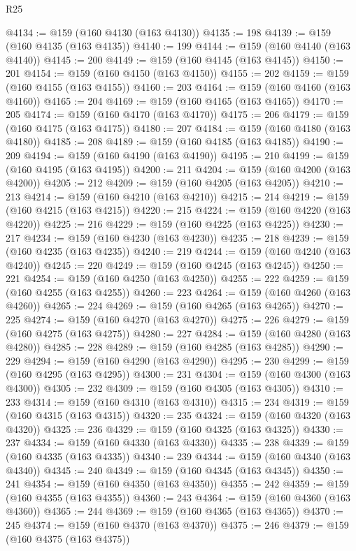 \begin{lexlean}{R25}
\begin{coremodule}
{{{{{{{{{{{{{{{{{{{{{{{{{{{{{{{{{{{{{{{{{{{{{{{{{{{{{{{{{{{{{{{{{{{{{{{{{{{{{{{{{{{{{{{{{{{{{{{{{{{{{{{{{{{{{{{{{{{{{{{{{{{{{{{{{{{{{{{{{{{{{{{{{{{{{{{{{{{{{{{{{{{{{{{{{{{{{{{{{{{{{{{{{{{{{{{{{{{{{{{@4134 := @159 (@160 @4130 (@163 @4130))
@4135 := 198
@4139 := @159 (@160 @4135 (@163 @4135))
@4140 := 199
@4144 := @159 (@160 @4140 (@163 @4140))
@4145 := 200
@4149 := @159 (@160 @4145 (@163 @4145))
@4150 := 201
@4154 := @159 (@160 @4150 (@163 @4150))
@4155 := 202
@4159 := @159 (@160 @4155 (@163 @4155))
@4160 := 203
@4164 := @159 (@160 @4160 (@163 @4160))
@4165 := 204
@4169 := @159 (@160 @4165 (@163 @4165))
@4170 := 205
@4174 := @159 (@160 @4170 (@163 @4170))
@4175 := 206
@4179 := @159 (@160 @4175 (@163 @4175))
@4180 := 207
@4184 := @159 (@160 @4180 (@163 @4180))
@4185 := 208
@4189 := @159 (@160 @4185 (@163 @4185))
@4190 := 209
@4194 := @159 (@160 @4190 (@163 @4190))
@4195 := 210
@4199 := @159 (@160 @4195 (@163 @4195))
@4200 := 211
@4204 := @159 (@160 @4200 (@163 @4200))
@4205 := 212
@4209 := @159 (@160 @4205 (@163 @4205))
@4210 := 213
@4214 := @159 (@160 @4210 (@163 @4210))
@4215 := 214
@4219 := @159 (@160 @4215 (@163 @4215))
@4220 := 215
@4224 := @159 (@160 @4220 (@163 @4220))
@4225 := 216
@4229 := @159 (@160 @4225 (@163 @4225))
@4230 := 217
@4234 := @159 (@160 @4230 (@163 @4230))
@4235 := 218
@4239 := @159 (@160 @4235 (@163 @4235))
@4240 := 219
@4244 := @159 (@160 @4240 (@163 @4240))
@4245 := 220
@4249 := @159 (@160 @4245 (@163 @4245))
@4250 := 221
@4254 := @159 (@160 @4250 (@163 @4250))
@4255 := 222
@4259 := @159 (@160 @4255 (@163 @4255))
@4260 := 223
@4264 := @159 (@160 @4260 (@163 @4260))
@4265 := 224
@4269 := @159 (@160 @4265 (@163 @4265))
@4270 := 225
@4274 := @159 (@160 @4270 (@163 @4270))
@4275 := 226
@4279 := @159 (@160 @4275 (@163 @4275))
@4280 := 227
@4284 := @159 (@160 @4280 (@163 @4280))
@4285 := 228
@4289 := @159 (@160 @4285 (@163 @4285))
@4290 := 229
@4294 := @159 (@160 @4290 (@163 @4290))
@4295 := 230
@4299 := @159 (@160 @4295 (@163 @4295))
@4300 := 231
@4304 := @159 (@160 @4300 (@163 @4300))
@4305 := 232
@4309 := @159 (@160 @4305 (@163 @4305))
@4310 := 233
@4314 := @159 (@160 @4310 (@163 @4310))
@4315 := 234
@4319 := @159 (@160 @4315 (@163 @4315))
@4320 := 235
@4324 := @159 (@160 @4320 (@163 @4320))
@4325 := 236
@4329 := @159 (@160 @4325 (@163 @4325))
@4330 := 237
@4334 := @159 (@160 @4330 (@163 @4330))
@4335 := 238
@4339 := @159 (@160 @4335 (@163 @4335))
@4340 := 239
@4344 := @159 (@160 @4340 (@163 @4340))
@4345 := 240
@4349 := @159 (@160 @4345 (@163 @4345))
@4350 := 241
@4354 := @159 (@160 @4350 (@163 @4350))
@4355 := 242
@4359 := @159 (@160 @4355 (@163 @4355))
@4360 := 243
@4364 := @159 (@160 @4360 (@163 @4360))
@4365 := 244
@4369 := @159 (@160 @4365 (@163 @4365))
@4370 := 245
@4374 := @159 (@160 @4370 (@163 @4370))
@4375 := 246
@4379 := @159 (@160 @4375 (@163 @4375))
}}}}}}}}}}}}}}}}}}}}}}}}}}}}}}}}}}}}}}}}}}}}}}}}}}}}}}}}}}}}}}}}}}}}}}}}}}}}}}}}}}}}}}}}}}}}}}}}}}}}}}}}}}}}}}}}}}}}}}}}}}}}}}}}}}}}}}}}}}}}}}}}}}}}}}}}}}}}}}}}}}}}}}}}}}}}}}}}}}}}}}}}}}}}}}}}}}}}}}}
\end{coremodule}
\end{lexlean}

